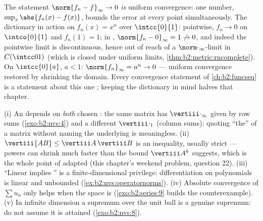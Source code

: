 \begin{example}\label{ex:b2:nvs:uniformdictionary}
The statement $\norm{f_n - f}_\infty \to 0$ \emph{is} uniform
convergence: one number, $\sup_x\abs{f_n(x) - f(x)}$, bounds
the error at every point simultaneously. The dictionary in
action on $f_n(x) = x^n$ over $\intcc{0}{1}$: pointwise, $f_n
\to 0$ on $\intco{0}{1}$ and $f_n(1) = 1$; in ,
$\norm{f_n - 0}_\infty = 1 \not\to 0$, and indeed the pointwise
limit is discontinuous, hence out of reach of a
$\norm\cdot_\infty$-limit in $C(\intcc01)$ (which is closed
under uniform limits, \cref{thm:b2:metric:rncomplete}). On
$\intcc{0}{a}$, $a < 1$: $\norm{f_n}_\infty = a^n \to 0$ ---
uniform convergence restored by shrinking the domain. Every
convergence statement of \cref{ch:b2:funcseq} is a statement
about this one ; keeping the dictionary in mind halves
that chapter.
\end{example}

\begin{remark}\label{rem:b2:nvs:pitfalls}
(i) An  depends on \emph{both} chosen : the
same matrix has $\vertiii\cdot_\infty$ given by row sums
(\cref{exo:b2:nvs:4}) and a different $\vertiii\cdot_1$ (column
sums); quoting ``the''  of a matrix without naming the
underlying  is meaningless. (ii) $\vertiii{AB} \leq
\vertiii A\,\vertiii B$ is an inequality, usually strict ---
powers can shrink much faster than the bound $\vertiii A^k$
suggests, which is the whole point of adapted  (this
chapter's weekend problem, question 22). (iii) ``Linear implies
'' is a finite-dimensional privilege: differentiation
on polynomials is linear and unbounded
(\cref{ex:b2:nvs:operatornorms}). (iv) Absolute convergence of
$\sum u_n$ only helps when the space is 
(\cref{exo:b2:series:9} builds the counterexample). (v) In
infinite dimension a supremum over the unit ball is a genuine
supremum: do not assume it is attained
(\cref{exo:b2:nvs:8}).
\end{remark}

